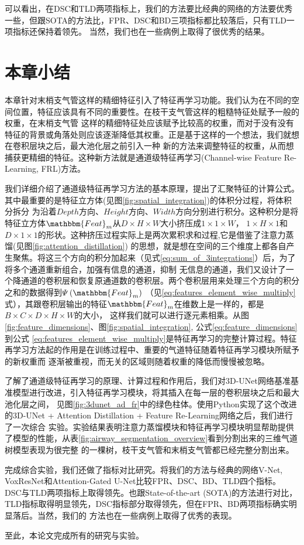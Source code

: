可以看出，在DSC和TLD两项指标上，我们的方法要比经典的网络的方法要优秀一些，但跟SOTA的方法比，FPR、DSC和BD三项指标都比较落后，只有TLD一项指标还保持着领先。
当然，我们也在一些病例上取得了很优秀的结果。


\section{本章小结}

本章针对末梢支气管这样的精细特征引入了特征再学习功能。我们认为在不同的空间位置，特征应该具有不同的重要性。在枝干支气管这样的粗糙特征处赋予一般的权重，在末梢支气管
这样的精细特征处应该赋予比较高的权重，而对于没有没有特征的背景或角落处则应该逐渐降低其权重。正是基于这样的一个想法，我们就想在卷积层块之后，最大池化层之前引入一种
新的方法来调整特征的权重，从而想捕获更精细的特征。这种新方法就是通道级特征再学习(Channel-wise Feature Re-Learning, FRL)方法。

我们详细介绍了通道级特征再学习方法的基本原理，提出了汇聚特征的计算公式。其中最重要的是特征立方体(见图\ref{fig:spatial_integration})的体积分过程，将体积分拆分
为沿着$Depth$方向、$Height$方向、$Width$方向分别进行积分。这种积分是将特征立方体$\mathbbm{Feat}_m$从$D \times H \times W$大小挤压成$1 \times 1 \times W$，
$1 \times H \times 1$和$D \times 1 \times 1$的形状。这种挤压过程实际上是两次累积求和过程,它是借鉴了注意力蒸馏(见图\ref{fig:attention_distillation})
的思想，就是想在空间的三个维度上都各自产生聚焦。将这三个方向的积分加起来（见式\ref{eq:sum_of_3integrations}）后，为了将多个通道重新组合，加强有信息的通道，抑制
无信息的通道，我们又设计了一个降通道的卷积层和恢复原通道数的卷积层。两个卷积层用来处理三个方向的积分之和的数据得到$\varPsi\left(\mathbbm{Feat}_m\right)$
（见\ref{eq:features_element_wise_multiply}式），其跟卷积层输出的特征$\mathbbm{Feat}_m$在维数上是一样的，都是$B \times C \times D \times H \times W$的大小，
这样我们就可以进行逐元素相乘。从图\ref{fig:feature_dimensions}、图\ref{fig:spatial_integration}, 公式\ref{eq:feature_dimensions}到公式
\ref{eq:features_element_wise_multiply}是特征再学习的完整计算过程。特征再学习方法起的作用是在训练过程中、重要的气道特征随着特征再学习模块所赋予的新权重而
逐渐被重视，而无关的区域则随着权重的降低而慢慢被忽略。

了解了通道级特征再学习的原理、计算过程和作用后，我们对3D-UNet网络基准基准模型进行改进，引入特征再学习模块，将其插入在每一层的卷积层块之后和最大池化层之间，
见图\ref{fig:3dunet_ad_fr}中的绿色柱体。使用Python实现了这个改进的3D-UNet + Attention Distillation + Feature Re-Learning网络之后，我们进行了一次综合
实验。实验结果表明注意力蒸馏模块和特征再学习模块明显帮助提供了模型的性能，从表\ref{fig:airway_segmentation_overview}看到分割出来的三维气道树模型表现为很完整
的一棵树，枝干支气管和末梢支气管都已经完整分割出来。

完成综合实验，我们还做了指标对比研究。将我们的方法与经典的网络V-Net, VoxResNet和Attention-Gated U-Net比较FPR、DSC、BD、TLD四个指标。
DSC与TLD两项指标上取得领先。也跟State-of-the-art (SOTA)的方法进行对比，TLD指标取得明显领先，DSC指标部分取得领先，但在FPR、BD两项指标确实明显落后。当然，我们的
方法也在一些病例上取得了优秀的表现。

至此，本论文完成所有的研究与实验。